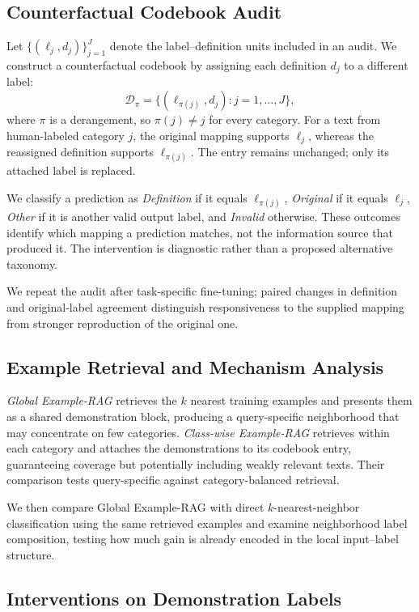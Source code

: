 \documentclass[11pt]{article}
\begin{document}
\subsection{Counterfactual Codebook Audit}
\label{sec:m-audit}

Let \(\{(\ell_j,d_j)\}_{j=1}^{J}\) denote the label--definition units included in an audit. We construct a counterfactual codebook by assigning each definition \(d_j\) to a different label:
\[
\mathcal{D}_{\pi}
=
\{(\ell_{\pi(j)},d_j):j=1,\ldots,J\},
\]
where \(\pi\) is a derangement, so \(\pi(j)\neq j\) for every category. For a text from human-labeled category \(j\), the original mapping supports \(\ell_j\), whereas the reassigned definition supports \(\ell_{\pi(j)}\). The entry remains unchanged; only its attached label is replaced.

We classify a prediction as \emph{Definition} if it equals \(\ell_{\pi(j)}\), \emph{Original} if it equals \(\ell_j\), \emph{Other} if it is another valid output label, and \emph{Invalid} otherwise. These outcomes identify which mapping a prediction matches, not the information source that produced it. The intervention is diagnostic rather than a proposed alternative taxonomy.

We repeat the audit after task-specific fine-tuning; paired changes in definition and original-label agreement distinguish responsiveness to the supplied mapping from stronger reproduction of the original one.

\subsection{Example Retrieval and Mechanism Analysis}
\label{sec:m-exrag}

\emph{Global Example-RAG} retrieves the \(k\) nearest training examples and presents them as a shared demonstration block, producing a query-specific neighborhood that may concentrate on few categories. \emph{Class-wise Example-RAG} retrieves within each category and attaches the demonstrations to its codebook entry, guaranteeing coverage but potentially including weakly relevant texts. Their comparison tests query-specific against category-balanced retrieval.

We then compare Global Example-RAG with direct \(k\)-nearest-neighbor classification using the same retrieved examples and examine neighborhood label composition, testing how much gain is already encoded in the local input--label structure.

\subsection{Interventions on Demonstration Labels}
\label{sec:m-rekey}
\end{document}
